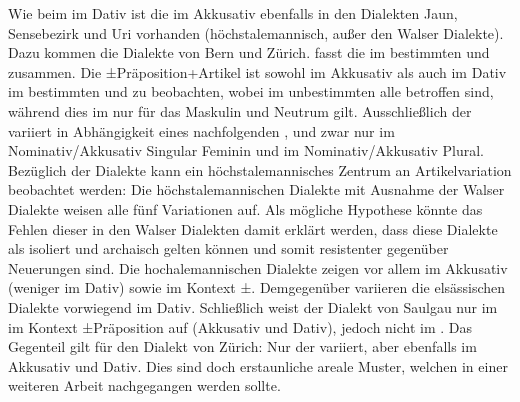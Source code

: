 Wie beim  im Dativ ist die  im Akkusativ ebenfalls in den Dialekten Jaun, Sensebezirk und Uri vorhanden (höchstalemannisch, außer den Walser Dialekte). Dazu kommen die Dialekte von Bern und Zürich.  fasst die  im bestimmten und  zusammen. Die  ±Präposition+Artikel ist sowohl im Akkusativ als auch im Dativ im bestimmten und  zu beobachten, wobei im unbestimmten alle  betroffen sind, während dies im  nur für das Maskulin und Neutrum gilt. Ausschließlich der  variiert in Abhängigkeit eines nachfolgenden , und zwar nur im Nominativ/Akkusativ Singular Feminin und im Nominativ/Akkusativ Plural. Bezüglich der Dialekte kann ein höchstalemannisches Zentrum an Artikelvariation beobachtet werden: Die höchstalemannischen Dialekte mit Ausnahme der Walser Dialekte weisen alle fünf Variationen auf. Als mögliche Hypothese könnte das Fehlen dieser  in den Walser Dialekten damit erklärt werden, dass diese Dialekte als isoliert und archaisch gelten können und somit resistenter gegenüber Neuerungen sind. Die hochalemannischen Dialekte zeigen  vor allem im Akkusativ (weniger im Dativ) sowie im Kontext ±. Demgegenüber variieren die elsässischen Dialekte vorwiegend im Dativ. Schließlich weist der Dialekt von Saulgau  nur im  im Kontext ±Präposition auf (Akkusativ und Dativ), jedoch nicht im . Das Gegenteil gilt für den Dialekt von Zürich: Nur der  variiert, aber ebenfalls im Akkusativ und Dativ. Dies sind doch erstaunliche areale Muster, welchen in einer weiteren Arbeit nachgegangen werden sollte.


